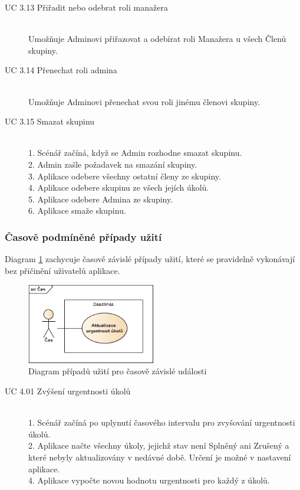 \documentclass[thesis=B,czech]{FITthesis}[2012/06/26]
\begin{document}
\begin{description}
				\item[UC 3.13 Přiřadit nebo odebrat roli manažera] \hfill \\
					Umožňuje Adminovi přiřazovat a odebírat roli Manažera u všech Členů skupiny.
					
				\item[UC 3.14 Přenechat roli admina] \hfill \\
					Umožňuje Adminovi přenechat svou roli jinému členovi skupiny.
					
				\item[UC 3.15 Smazat skupinu] \hfill \\
					1. Scénář začíná, když se Admin rozhodne smazat skupinu. \\
					2. Admin zašle požadavek na smazání skupiny. \\
					3. Aplikace odebere všechny ostatní členy ze skupiny. \\
					4. Aplikace odebere skupinu ze všech jejích úkolů. \\
					5. Aplikace odebere Admina ze skupiny. \\
					6. Aplikace smaže skupinu. \\
					
			\end{description}

			
			
			\subsubsection{Časově podmíněné případy užití}
			Diagram \ref{diagram:uc-time} zachycuje časově závislé případy užití, které se pravidelně vykonávají bez přičinění uživatelů aplikace.
			\begin{figure}\centering
				\includegraphics[width=0.5\textwidth]{ea-diagrams/uc-time.png}
				\caption[Případy užití časových událostí]{Diagram případů užití pro časově závislé události}
				\label{diagram:uc-time}
			\end{figure}
			
			\begin{description}
				\item[UC 4.01 Zvýšení urgentnosti úkolů] \hfill \\
					1. Scénář začíná po uplynutí časového intervalu pro zvyšování urgentnosti úkolů. \\
					2. Aplikace načte všechny úkoly, jejichž stav není Splněný ani Zrušený a které nebyly aktualizovány v nedávné době. Určení  je možné v nastavení aplikace. \\
					4. Aplikace vypočte novou hodnotu urgentnosti pro každý z úkolů. \\
			\end{description}
			
\end{document}
